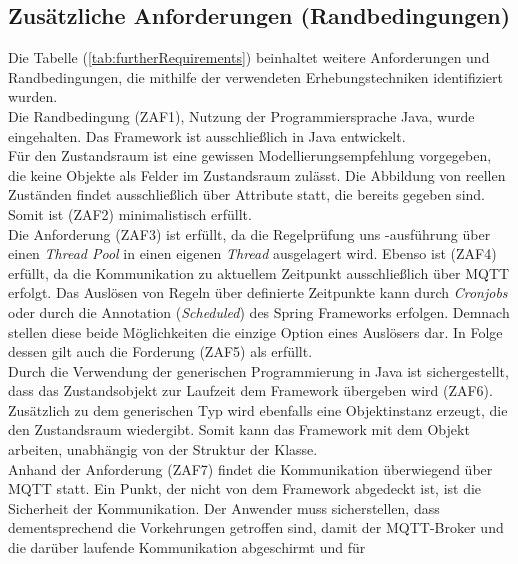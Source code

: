     \subsection*{Zusätzliche Anforderungen (Randbedingungen)}
        Die Tabelle (\ref{tab:furtherRequirements}) beinhaltet weitere Anforderungen und Randbedingungen, die mithilfe der verwendeten 
        Erhebungstechniken identifiziert wurden. 
        \\
        Die Randbedingung (ZAF1), Nutzung der Programmiersprache Java, wurde eingehalten. Das Framework ist ausschließlich in Java entwickelt. 
        \\
        Für den Zustandsraum ist eine gewissen Modellierungsempfehlung vorgegeben, die keine Objekte als Felder im Zustandsraum zulässt. Die 
        Abbildung von reellen Zuständen findet 
        ausschließlich über Attribute statt, die bereits gegeben sind. Somit ist (ZAF2) minimalistisch erfüllt. 
        \\
        \linebreak
        Die Anforderung (ZAF3) ist erfüllt, da die Regelprüfung uns -ausführung über einen \textit{Thread Pool} in einen eigenen \textit{Thread} ausgelagert wird. Ebenso 
        ist (ZAF4) erfüllt, da die Kommunikation zu aktuellem Zeitpunkt ausschließlich über \acs{MQTT} erfolgt. Das Auslösen von Regeln über definierte Zeitpunkte kann durch 
        \textit{Cronjobs} oder durch die Annotation (\textit{\@ Scheduled}) des Spring Frameworks erfolgen. Demnach stellen diese beide Möglichkeiten die einzige Option eines 
        Auslösers dar. In Folge dessen gilt auch die Forderung (ZAF5) als erfüllt.
        \\
        \linebreak
        Durch die Verwendung der generischen Programmierung in Java ist sichergestellt, dass das Zustandsobjekt zur Laufzeit dem Framework übergeben wird (ZAF6). Zusätzlich zu dem generischen 
        Typ wird ebenfalls eine Objektinstanz erzeugt, die den Zustandsraum wiedergibt. Somit kann das Framework mit dem Objekt arbeiten, unabhängig von der Struktur der Klasse.
        \\
        \linebreak
        Anhand der Anforderung (ZAF7) findet die Kommunikation überwiegend über \acs{MQTT} statt. Ein Punkt, der nicht von dem Framework abgedeckt ist, ist die Sicherheit der 
        Kommunikation. Der Anwender muss sicherstellen, dass dementsprechend die Vorkehrungen getroffen sind, damit der \acs{MQTT}-Broker und die darüber laufende Kommunikation abgeschirmt und für 
